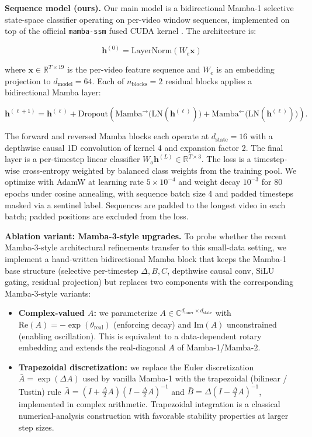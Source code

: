 \documentclass{article}
\begin{document}
\textbf{Sequence model (ours).} Our main model is a bidirectional Mamba-1 selective state-space classifier operating on per-video window sequences, implemented on top of the official \texttt{mamba-ssm} fused CUDA kernel \cite{gu2023mamba}. The architecture is:

\[
\mathbf{h}^{(0)} = \mathrm{LayerNorm}(W_e \mathbf{x})
\]

where $\mathbf{x} \in \mathbb{R}^{T \times 19}$ is the per-video feature sequence and $W_e$ is an embedding projection to $d_\text{model} = 64$. Each of $n_\text{blocks} = 2$ residual blocks applies a bidirectional Mamba layer:

\[
\mathbf{h}^{(\ell+1)} = \mathbf{h}^{(\ell)} + \mathrm{Dropout}\!\left(\mathrm{Mamba}^{\rightarrow}\!\big(\mathrm{LN}(\mathbf{h}^{(\ell)})\big) + \mathrm{Mamba}^{\leftarrow}\!\big(\mathrm{LN}(\mathbf{h}^{(\ell)})\big)\right).
\]

The forward and reversed Mamba blocks each operate at $d_\text{state} = 16$ with a depthwise causal 1D convolution of kernel 4 and expansion factor 2. The final layer is a per-timestep linear classifier $W_o \mathbf{h}^{(L)} \in \mathbb{R}^{T \times 3}$. The loss is a timestep-wise cross-entropy weighted by balanced class weights from the training pool. We optimize with AdamW at learning rate $5 \times 10^{-4}$ and weight decay $10^{-3}$ for 80 epochs under cosine annealing, with sequence batch size 4 and padded timesteps masked via a sentinel label. Sequences are padded to the longest video in each batch; padded positions are excluded from the loss.

\textbf{Ablation variant: Mamba-3-style upgrades.} To probe whether the recent Mamba-3-style architectural refinements transfer to this small-data setting, we implement a hand-written bidirectional Mamba block that keeps the Mamba-1 base structure (selective per-timestep $\Delta, B, C$, depthwise causal conv, SiLU gating, residual projection) but replaces two components with the corresponding Mamba-3-style variants:

\begin{itemize}
    \item \textbf{Complex-valued $A$:} we parameterize $A \in \mathbb{C}^{d_\text{inner} \times d_\text{state}}$ with $\mathrm{Re}(A) = -\exp(\theta_\text{real})$ (enforcing decay) and $\mathrm{Im}(A)$ unconstrained (enabling oscillation). This is equivalent to a data-dependent rotary embedding and extends the real-diagonal $A$ of Mamba-1/Mamba-2.
    \item \textbf{Trapezoidal discretization:} we replace the Euler discretization $\bar{A} = \exp(\Delta A)$ used by vanilla Mamba-1 with the trapezoidal (bilinear / Tustin) rule $\bar{A} = (I + \tfrac{\Delta}{2}A)(I - \tfrac{\Delta}{2}A)^{-1}$ and $\bar{B} = \Delta (I - \tfrac{\Delta}{2}A)^{-1}$, implemented in complex arithmetic. Trapezoidal integration is a classical numerical-analysis construction \cite{hairer1996} with favorable stability properties at larger step sizes.
\end{itemize}
\end{document}
